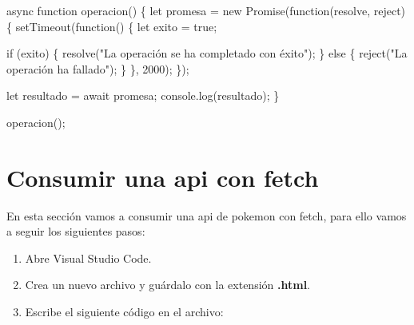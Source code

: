 \documentclass[
  a4paper,
  DIV=11,
  numbers=noendperiod,
  onepage,
  openany]{scrreprt}
\newenvironment{Shaded}{\begin{snugshade}}{\end{snugshade}}
\newcommand{\BuiltInTok}[1]{\textcolor[rgb]{0.00,0.23,0.31}{#1}}
\newcommand{\ControlFlowTok}[1]{\textcolor[rgb]{0.00,0.23,0.31}{#1}}
\newcommand{\DecValTok}[1]{\textcolor[rgb]{0.68,0.00,0.00}{#1}}
\newcommand{\FunctionTok}[1]{\textcolor[rgb]{0.28,0.35,0.67}{#1}}
\newcommand{\KeywordTok}[1]{\textcolor[rgb]{0.00,0.23,0.31}{#1}}
\newcommand{\NormalTok}[1]{\textcolor[rgb]{0.00,0.23,0.31}{#1}}
\newcommand{\OperatorTok}[1]{\textcolor[rgb]{0.37,0.37,0.37}{#1}}
\newcommand{\PreprocessorTok}[1]{\textcolor[rgb]{0.68,0.00,0.00}{#1}}
\newcommand{\StringTok}[1]{\textcolor[rgb]{0.13,0.47,0.30}{#1}}
\begin{document}
\begin{Shaded}
\begin{Highlighting}[]
\KeywordTok{async} \KeywordTok{function} \FunctionTok{operacion}\NormalTok{() \{}
    \KeywordTok{let}\NormalTok{ promesa }\OperatorTok{=} \KeywordTok{new} \BuiltInTok{Promise}\NormalTok{(}\KeywordTok{function}\NormalTok{(resolve}\OperatorTok{,}\NormalTok{ reject) \{}
        \PreprocessorTok{setTimeout}\NormalTok{(}\KeywordTok{function}\NormalTok{() \{}
            \KeywordTok{let}\NormalTok{ exito }\OperatorTok{=} \KeywordTok{true}\OperatorTok{;}

            \ControlFlowTok{if}\NormalTok{ (exito) \{}
                \FunctionTok{resolve}\NormalTok{(}\StringTok{"La operación se ha completado con éxito"}\NormalTok{)}\OperatorTok{;}
\NormalTok{            \} }\ControlFlowTok{else}\NormalTok{ \{}
                \FunctionTok{reject}\NormalTok{(}\StringTok{"La operación ha fallado"}\NormalTok{)}\OperatorTok{;}
\NormalTok{            \}}
\NormalTok{        \}}\OperatorTok{,} \DecValTok{2000}\NormalTok{)}\OperatorTok{;}
\NormalTok{    \})}\OperatorTok{;}

    \KeywordTok{let}\NormalTok{ resultado }\OperatorTok{=} \ControlFlowTok{await}\NormalTok{ promesa}\OperatorTok{;}
    \BuiltInTok{console}\OperatorTok{.}\FunctionTok{log}\NormalTok{(resultado)}\OperatorTok{;}
\NormalTok{\}}

\FunctionTok{operacion}\NormalTok{()}\OperatorTok{;}
\end{Highlighting}
\end{Shaded}

\section{Consumir una api con fetch}\label{consumir-una-api-con-fetch}

En esta sección vamos a consumir una api de pokemon con fetch, para ello
vamos a seguir los siguientes pasos:

\begin{enumerate}
\def\labelenumi{\arabic{enumi}.}
\item
  Abre Visual Studio Code.
\item
  Crea un nuevo archivo y guárdalo con la extensión \textbf{.html}.
\item
  Escribe el siguiente código en el archivo:
\end{enumerate}
\end{document}
